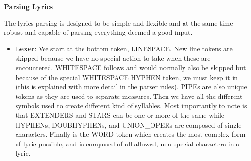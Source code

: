 \documentclass[12pt]{book}
\begin{document}
\newpage

\newpage
\centerline{{\large \bf Parsing Lyrics}}

The lyrics parsing is designed to be simple and flexible and at the same time robust and capable of parsing everything deemed a good input. 

\begin{itemize}
\item {\bf Lexer}: We start at the bottom token, LINESPACE. New line tokens are skipped because we have no special action to take when these are encountered. WHITESPACE follows and would normally also be skipped but because of the special WHITESPACE HYPHEN token, we must keep it in (this is explained with more detail in the parser rules). PIPEs are also unique tokens as they are used to separate measures. Then we have all the different symbols used to create different kind of syllables. Most importantly to note is that EXTENDERS and STARS can be one or more of the same while HYPHENs, DOUBHYPHENs, and UNION\_OPERs are composed of single characters. Finally is the WORD token which creates the most complex form of lyric possible, and is composed of all allowed, non-special characters in a lyric.


\end{itemize}
\end{document}
